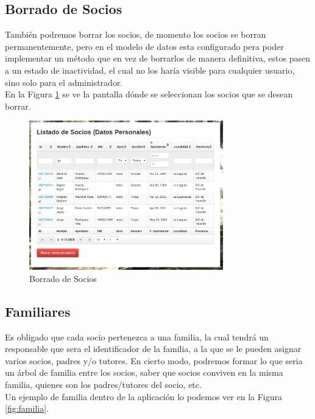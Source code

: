\subsection{Borrado de Socios}
También podremos borrar los socios, de momento los socios se borran permanentemente, pero en el modelo de datos esta configurado pera poder implementar un método que en vez de borrarlos de manera definitiva, estos pasen
a un estado de inactividad, el cual no los haría visible para cualquier usuario, sino solo para el administrador.\\

En la Figura \ref{fig:borrar_socio} se ve la pantalla dónde se seleccionan los socios que se desean borrar.\\

\begin{figure}[H]
\begin{center}
\includegraphics[width=0.75\textwidth]{images/borrado_socios.jpg}
\caption{Borrado de Socios}
\label{fig:borrar_socio}
\end{center}
\end{figure}

\subsection{Familiares}

Es obligado que cada socio pertenezca a una familia, la cual tendrá un responsable que sera el identificador de la familia, a la que se le pueden asignar varios socios, padres y/o tutores. En cierto modo, podremos
formar lo que seria un árbol de familia entre los socios, saber que socios conviven en la misma familia, quienes son los padres/tutores del socio, etc.\\

Un ejemplo de familia dentro de la aplicación lo podemos ver en la Figura \ref{fig:familia}.\\

